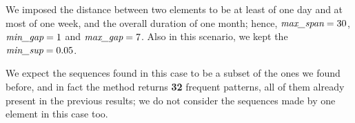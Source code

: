 We imposed the distance between two elements to be at least of one day and at most of one week, and the overall duration of one month; hence, $\emph{max\_span} = 30$, $\emph{min\_gap} = 1$ and $\emph{max\_gap} = 7$. Also in this scenario, we kept the $\emph{min\_sup} = 0.05$.

We expect the sequences found in this case to be a subset of the ones we found before, and in fact the method returns \textbf{32} frequent patterns, all of them already present in the previous results; we do not consider the sequences made by one element in this case too. 
